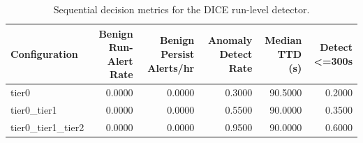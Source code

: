 \begin{table}[t]
\centering
\caption{Sequential decision metrics for the DICE run-level detector.}
\label{tab:dice_sequential_metrics}
\footnotesize
\begin{tabular}{lrrrrr}
\toprule
Configuration & Benign Run-Alert Rate & Benign Persist Alerts/hr & Anomaly Detect Rate & Median TTD (s) & Detect <=300s \\
\midrule
tier0 & 0.0000 & 0.0000 & 0.3000 & 90.5000 & 0.2000 \\
tier0_tier1 & 0.0000 & 0.0000 & 0.5500 & 90.0000 & 0.3500 \\
tier0_tier1_tier2 & 0.0000 & 0.0000 & 0.9500 & 90.0000 & 0.6000 \\
\bottomrule
\end{tabular}

\end{table}
